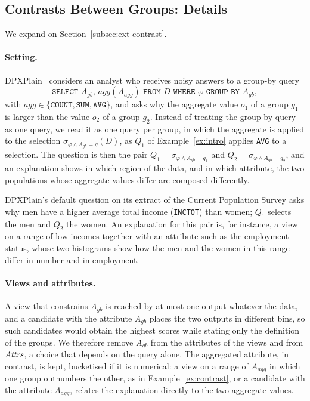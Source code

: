 \subsection{Contrasts Between Groups: Details}
\label{app:contrast-shares}

We expand on Section~\ref{subsec:ext-contrast}.

\paragraph{Setting.}
DPXPlain~\cite{TaoGMR22} considers an analyst who receives noisy answers to a group-by query
\[
\texttt{SELECT } A_{gb},\, agg(A_{agg})
\texttt{ FROM } D
\texttt{ WHERE } \varphi
\texttt{ GROUP BY } A_{gb} ,
\]
with $agg\in\{\texttt{COUNT},\texttt{SUM},\texttt{AVG}\}$, and asks why the aggregate value $o_1$ of a group $g_1$ is larger than the value $o_2$ of a group $g_2$.
Instead of treating the group-by query as one query, we read it as one query per group, in which the aggregate is applied to the selection $\sigma_{\varphi\wedge A_{gb}=g}(D)$, as $Q_1$ of Example~\ref{ex:intro} applies \texttt{AVG} to a selection.
The question is then the pair $Q_1=\sigma_{\varphi\wedge A_{gb}=g_1}$ and $Q_2=\sigma_{\varphi\wedge A_{gb}=g_2}$, and an explanation shows in which region of the data, and in which attribute, the two populations whose aggregate values differ are composed differently.

\begin{example}
\label{ex:contrast}
DPXPlain's default question on its extract of the Current Population Survey asks why men have a higher average total income (\texttt{INCTOT}) than women; $Q_1$ selects the men and $Q_2$ the women.
An explanation for this pair is, for instance, a view on a range of low incomes together with an attribute such as the employment status, whose two histograms show how the men and the women in this range differ in number and in employment.
\end{example}

\paragraph{Views and attributes.}
A view that constrains $A_{gb}$ is reached by at most one output whatever the data, and a candidate with the attribute $A_{gb}$ places the two outputs in different bins, so such candidates would obtain the highest scores while stating only the definition of the groups.
We therefore remove $A_{gb}$ from the attributes of the views and from $\mathit{Attrs}$, a choice that depends on the query alone.
The aggregated attribute, in contrast, is kept, bucketised if it is numerical: a view on a range of $A_{agg}$ in which one group outnumbers the other, as in Example~\ref{ex:contrast}, or a candidate with the attribute $A_{agg}$, relates the explanation directly to the two aggregate values.

